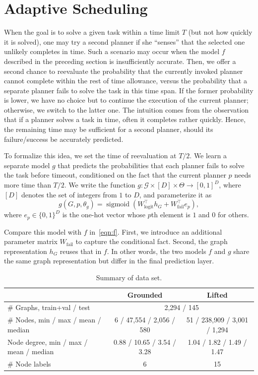 \documentclass[letterpaper]{article} %
\DeclareMathOperator{\sigmoid}{sigmoid}
\begin{document}
\section{Adaptive Scheduling}
When the goal is to solve a given task within a time limit $T$ (but not how quickly it is solved), one may try a second planner if she ``senses'' that the selected one unlikely completes in time. Such a scenario may occur when the model $f$ described in the preceding section is insufficiently accurate. Then, we offer a second chance to reevaluate the probability that the currently invoked planner cannot complete within the rest of time allowance, versus the probability that a separate planner fails to solve the task in this time span. If the former probability is lower, we have no choice but to continue the execution of the current planner; otherwise, we switch to the latter one. The intuition comes from the observation that if a planner solves a task in time, often it completes rather quickly. Hence, the remaining time may be sufficient for a second planner, should its failure/success be accurately predicted.

To formalize this idea, we set the time of reevaluation at $T/2$. We learn a separate model $g$ that predicts the probabilities that each planner fails to solve the task before timeout, conditioned on the fact that the current planner $p$ needs more time than $T/2$. We write the function $g:\mathcal{G}\times[D]\times\Theta\to[0,1]^D$, where $[D]$ denotes the set of integers from $1$ to $D$, and parameterize it as
\[
g(G,p,\theta_g)=\sigmoid(W_{\text{logit}}^{\top}h_G+W_{\text{fail}}^{\top}e_p),
\]
where $e_p\in\{0,1\}^D$ is the one-hot vector whose $p$th element is $1$ and $0$ for others.

Compare this model with $f$ in~\eqref{eqn:f}. First, we introduce an additional parameter matrix $W_{\text{fail}}$ to capture the conditional fact. Second, the graph representation $h_G$ reuses that in $f$. In other words, the two models $f$ and $g$ share the same graph representation but differ in the final prediction layer.

\begin{table}[ht]
\centering
\caption{Summary of data set.}
\label{tab:data.set}
\begin{tabular}{lcc}
\hline
& Grounded & Lifted   \\
\hline
\# Graphs, train+val / test & \multicolumn{2}{c}{2,294 / 145}\\
\# Nodes, min / max / mean / median & 6 / 47,554 / 2,056 / 580 & 51 / 238,909 / 3,001 / 1,294 \\
Node degree, min / max / mean / median & 0.88 / 10.65 / 3.54 / 3.28 & 1.04 / 1.82 / 1.49 / 1.47 \\
\# Node labels & 6 & 15 \\
\hline
\end{tabular}
\end{table}
\end{document}
